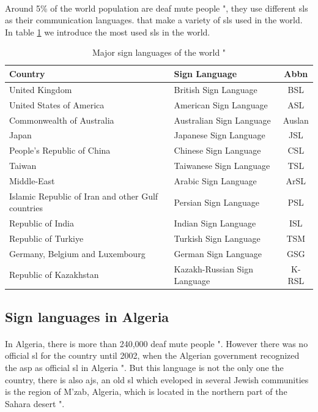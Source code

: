 \paragraph{}
Around 5\% of the world population are deaf mute people "\cite{5perc}, they use different \ac{sl}s as their communication languages. that make a variety of \ac{sl}s used in the world. In table \ref{tab:major-sign-languages-of-the-world} we introduce the most used \ac{sl}s in the world.
\begin{table}[h]
	\caption{Major sign languages of the world "\cite{state_of_the_art}}
	\label{tab:major-sign-languages-of-the-world}
	\begin{tabular}{|l|l|c|}
		\hline
		\textbf{Country}  & \textbf{Sign Language} & \textbf{Abbn} \\
		\hline
		United Kingdom & British Sign Language & BSL \\
		\hline
		United States of America & American Sign Language & ASL \\
		\hline
		Commonwealth of Australia & Australian Sign Language & Auslan \\
		\hline
		Japan & Japanese Sign Language & JSL \\
		\hline
		People's Republic of China & Chinese Sign Language & CSL \\
		\hline
		Taiwan & Taiwanese Sign Language & TSL \\
		\hline
		Middle-East & Arabic Sign Language & ArSL \\
		\hline
		Islamic Republic of Iran and other Gulf countries & Persian Sign Language & PSL \\
		\hline
		Republic of India & Indian Sign Language & ISL \\
		\hline
		Republic of Turkiye & Turkish Sign Language & TSM \\
		\hline
		 Germany, Belgium and Luxembourg& German Sign Language& GSG \\
		\hline
		Republic of Kazakhstan & Kazakh-Russian Sign Language & K-RSL \\
		\hline
	\end{tabular}
\end{table}
\subsection{Sign languages in Algeria}
\paragraph{}
In Algeria, there is more than 240,000 deaf mute people "\cite{ethnologue}. However there was no official \ac{sl} for the country until 2002, when the Algerian government  recognized the \ac{asp} as official \ac{sl} in Algeria "\cite{wiki}. But this language is not the only one the country, there is also \ac{ajs}, an old \ac{sl} which eveloped in several Jewish communities is the region of M'zab, Algeria, which is located in the northern part of the Sahara desert "\cite{sara}.
